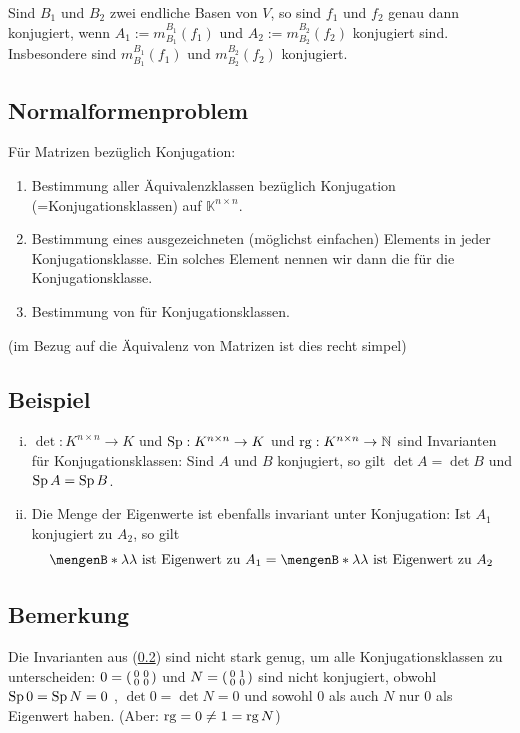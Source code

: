 Sind $B_1$ und $B_2$ zwei endliche Basen von $V$, so sind $f_1$ und $f_2$ genau dann konjugiert, wenn $A_1 := m_{B_1}^{B_1} (f_1)$ und $A_2 := m_{B_2}^{B_2}(f_2)$
konjugiert sind. Insbesondere sind $m_{B_1}^{B_1} (f_1)$ und $ m_{B_2}^{B_2}(f_2)$ konjugiert.

\subsection{Normalformenproblem} %
\label{sub:52}
Für Matrizen bezüglich Konjugation:
\begin{enumerate}[(1)]
	\item Bestimmung aller Äquivalenzklassen bezüglich Konjugation (=Konjugationsklassen) auf $\mathds{K}^{n \times n}$.
	\item Bestimmung eines ausgezeichneten (möglichst einfachen) Elements in jeder Konjugationsklasse. Ein solches Element nennen wir
	dann die  für die Konjugationsklasse. 
	\item Bestimmung von  für Konjugationsklassen.
\end{enumerate}
(im Bezug auf die Äquivalenz von Matrizen ist dies recht simpel)

\subsection[Beispiele zu Invarianten]{Beispiel} %
\label{sub:53}
\begin{enumerate}[i)]
	\item $\det : K^{n \times n} \to K$ und $\operatorname{Sp} : K^{n \times n} \to K$ und $\operatorname{rg} : K^{n \times n} \to \mathbb{N}$ sind Invarianten für 
	Konjugationsklassen: Sind $A$ und $B$ konjugiert, so gilt $\det A = \det B$ und $\operatorname{Sp} A = \operatorname{Sp} B$.  
	\item Die Menge der Eigenwerte ist ebenfalls invariant unter Konjugation: Ist $A_1$ konjugiert zu $A_2$, so gilt 
	\[
		\set[\lambda ]{\lambda  \text{ ist Eigenwert zu }A_1} = \set[\lambda ]{\lambda  \text{ ist Eigenwert zu }A_2} 
	\]
\end{enumerate}

\subsection[Bemerkung, dass Invarianten nicht reichen zur Unterscheidung der Konjugationsklassen]{Bemerkung} %
\label{sub:54}
Die Invarianten aus (\ref{sub:53}) sind nicht stark genug, um alle Konjugationsklassen zu unterscheiden: $0 = (\begin{smallmatrix}0 & 0 \\ 0 &0 \end{smallmatrix})$
und $N = (\begin{smallmatrix}0 & 1 \\ 0 &0 \end{smallmatrix})$ sind nicht konjugiert, obwohl $\operatorname{Sp} 0 = \operatorname{Sp} N = 0$ , $\det 0 = \det N = 0$ und sowohl 0 als auch $N$ 
nur 0 als Eigenwert haben. (Aber: $\operatorname{rg} = 0 \not= 1 = \operatorname{rg} N$)

